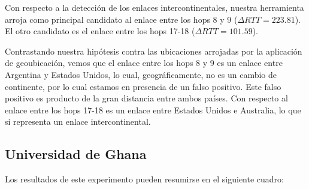 Con respecto a la detección de los enlaces intercontinentales, nuestra herramienta arroja como principal candidato al enlace entre los hops 8 y 9 ($\Delta RTT = 223.81$). El otro candidato es el enlace entre los hops 17-18 ($\Delta RTT = 101.59$).

Contrastando nuestra hipótesis contra las ubicaciones arrojadas por la aplicación de geoubicación, vemos que el enlace entre los hops 8 y 9 es un enlace entre Argentina y Estados Unidos, lo cual, geográficamente, no es un cambio de continente, por lo cual estamos en presencia de un falso positivo. Este falso positivo es producto de la gran distancia entre ambos países. Con respecto al enlace entre los hops 17-18 es un enlace entre Estados Unidos e Australia, lo que si representa un enlace intercontinental.

\subsection{Universidad de Ghana}

Los resultados de este experimento pueden resumirse en el siguiente cuadro:

